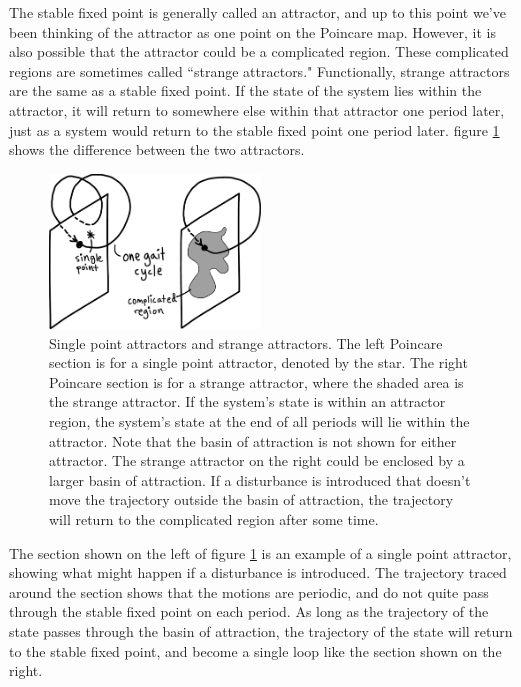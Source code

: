 The stable fixed point is generally called an attractor, and up to this point we've been thinking of the attractor as one point on the Poincare map. However, it is also possible that the attractor could be a complicated region. These complicated regions are sometimes called ``strange attractors." Functionally, strange attractors are the same as a stable fixed point. If the state of the system lies within the attractor, it will return to somewhere else within that attractor one period later, just as a system would return to the stable fixed point one period later. figure \ref{fig:Attractors} shows the difference between the two attractors.

\begin{figure}[h]		%
\begin{centering}
\includegraphics[width=0.5\textwidth]{Figures/Attractors}\par
\end{centering}
\caption[Diagram: Single Point Attractors and Strange Attractors]{Single point attractors and strange attractors. The left Poincare section is for a single point attractor, denoted by the star. The right Poincare section is for a strange attractor, where the shaded area is the strange attractor. If the system's state is within an attractor region, the system's state at the end of all periods will lie within the attractor. Note that the basin of attraction is not shown for either attractor. The strange attractor on the right could be enclosed by a larger basin of attraction. If a disturbance is introduced that doesn't move the trajectory outside the basin of attraction, the trajectory will return to the complicated region after some time.}
\label{fig:Attractors}
\end{figure}
%

The section shown on the left of figure \ref{fig:Attractors} is an example of a
single point attractor, showing what might happen if a disturbance is
introduced. The trajectory traced around the section shows that the motions are
periodic, and do not quite pass through the stable fixed point on each period.
As long as the trajectory of the state passes through the basin of attraction,
the trajectory of the state will return to the stable fixed point, and become a
single loop like the section shown on the right. 

